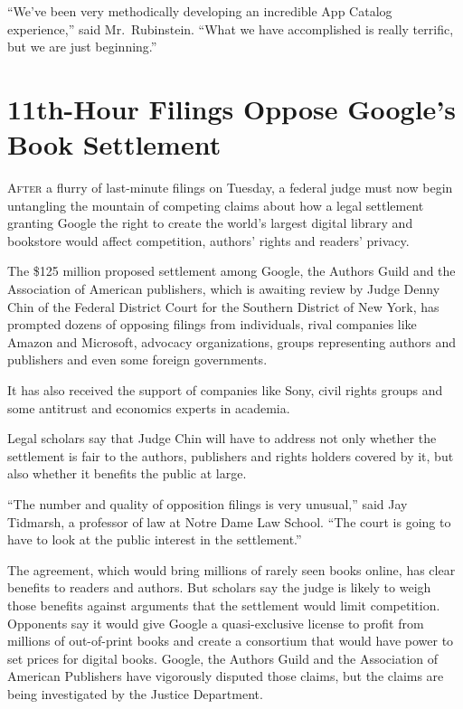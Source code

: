 ﻿\documentclass[12pt]{article}
\begin{document}
``We've been very methodically developing an incredible App Catalog experience,'' said
Mr.~Rubinstein. ``What we have accomplished is really terrific, but we are just beginning.''

\section{11th-Hour Filings Oppose Google's Book Settlement}

\lettrine{A}{fter} a flurry\cite{flurry} of last-minute filings on Tuesday, a federal judge must now
begin untangling the mountain of competing claims about how a legal settlement granting Google the
right to create the world's largest digital library and bookstore would affect competition, authors'
rights and readers' privacy.

The \$125 million proposed settlement among Google, the Authors Guild and the Association of
American publishers, which is awaiting review by Judge Denny Chin of the Federal District Court for
the Southern District of New York, has prompted dozens of opposing filings from individuals, rival
companies like Amazon and Microsoft, advocacy organizations, groups representing authors and
publishers and even some foreign governments.

It has also received the support of companies like Sony, civil rights groups and some antitrust and
economics experts in academia.

Legal scholars say that Judge Chin will have to address not only whether the settlement is fair to
the authors, publishers and rights holders covered by it, but also whether it benefits the public at
large.

``The number and quality of opposition filings is very unusual,'' said Jay Tidmarsh, a professor of
law at Notre Dame Law School. ``The court is going to have to look at the public interest in the
settlement.''

The agreement, which would bring millions of rarely seen books online, has clear benefits to readers
and authors. But scholars say the judge is likely to weigh those benefits against arguments that the
settlement would limit competition. Opponents say it would give Google a quasi-exclusive license to
profit from millions of out-of-print books and create a consortium that would have power to set
prices for digital books. Google, the Authors Guild and the Association of American Publishers have
vigorously disputed those claims, but the claims are being investigated by the Justice Department.
\end{document}
